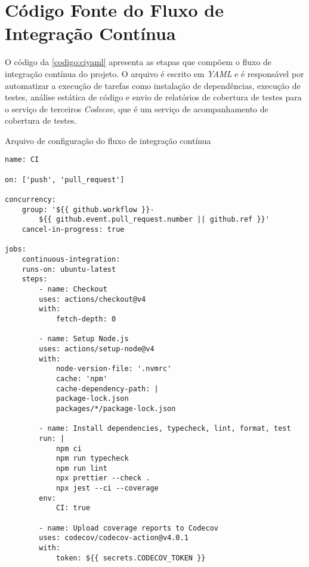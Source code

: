 
\chapter{Código Fonte do Fluxo de Integração Contínua}\label{cap:apendiceb}

O código da \autoref{codigo:ciyaml} apresenta as etapas que compõem o fluxo de integração contínua do projeto. O arquivo é escrito em \textit{YAML} e é responsável por automatizar a execução de tarefas como instalação de dependências, execução de testes, análise estática de código e envio de relatórios de cobertura de testes para o serviço de terceiros \textit{Codecov}, que é um serviço de acompanhamento de cobertura de testes.

\begin{sourcecode}[htb]
\caption{\label{codigo:ciyaml}Arquivo de configuração do fluxo de integração contínua}
\begin{lstlisting}[frame=single]
name: CI

on: ['push', 'pull_request']

concurrency:
    group: '${{ github.workflow }}-
        ${{ github.event.pull_request.number || github.ref }}'
    cancel-in-progress: true

jobs:
    continuous-integration:
    runs-on: ubuntu-latest
    steps:
        - name: Checkout
        uses: actions/checkout@v4
        with:
            fetch-depth: 0

        - name: Setup Node.js
        uses: actions/setup-node@v4
        with:
            node-version-file: '.nvmrc'
            cache: 'npm'
            cache-dependency-path: |
            package-lock.json
            packages/*/package-lock.json

        - name: Install dependencies, typecheck, lint, format, test
        run: |
            npm ci
            npm run typecheck
            npm run lint
            npx prettier --check .
            npx jest --ci --coverage
        env:
            CI: true

        - name: Upload coverage reports to Codecov
        uses: codecov/codecov-action@v4.0.1
        with:
            token: ${{ secrets.CODECOV_TOKEN }}
    
\end{lstlisting}
\fonte{}
\end{sourcecode}